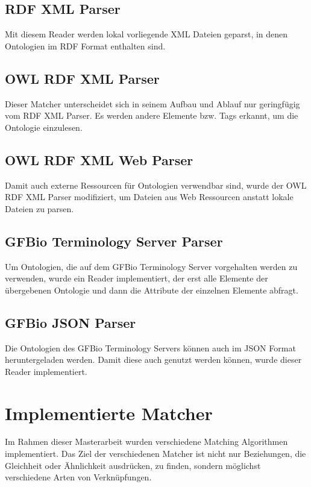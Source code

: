 		\subsection{RDF XML Parser}
		Mit diesem Reader werden lokal vorliegende XML Dateien geparst, in denen
		Ontologien im RDF Format enthalten sind.
		
		\subsection{OWL RDF XML Parser}
		Dieser Matcher unterscheidet sich in seinem Aufbau und Ablauf nur geringfügig
		vom RDF XML Parser. Es werden andere Elemente bzw. Tags erkannt, um die
		Ontologie einzulesen.
		
		\subsection{OWL RDF XML Web Parser}
		Damit auch externe Ressourcen für Ontologien verwendbar sind, wurde der OWL
		RDF XML Parser modifiziert, um Dateien aus Web Ressourcen anstatt lokale
		Dateien zu parsen.
		
		\subsection{GFBio Terminology Server Parser}
		Um Ontologien, die auf dem GFBio Terminology Server vorgehalten werden zu
		verwenden, wurde ein Reader implementiert, der erst alle Elemente der
		übergebenen Ontologie und dann die Attribute der einzelnen Elemente abfragt.
		
		\subsection{GFBio JSON Parser}
		Die Ontologien des GFBio Terminology Servers können auch im JSON Format
		heruntergeladen werden. Damit diese auch genutzt werden können, wurde
		dieser Reader implementiert. 
		
		\section{Implementierte Matcher}
		\label{ImplementierteMatcher}
		Im Rahmen dieser Masterarbeit wurden verschiedene Matching Algorithmen
		implementiert. Das Ziel der verschiedenen Matcher ist nicht nur Beziehungen,
		die Gleichheit oder Ähnlichkeit ausdrücken, zu finden, sondern möglichst
		verschiedene Arten von Verknüpfungen.
		

